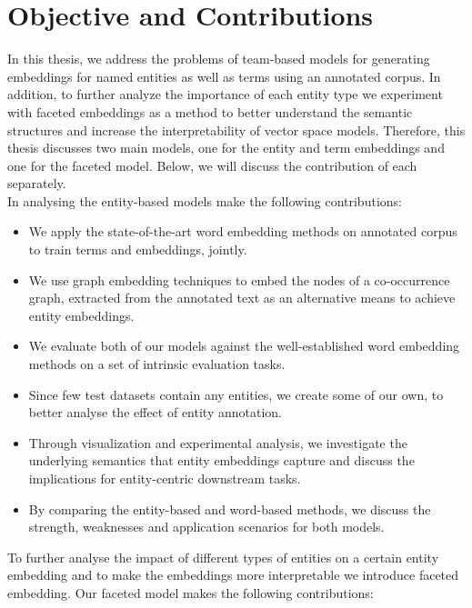 \section{Objective and Contributions}
In this thesis, we address the problems of team-based models for generating embeddings for named entities as well as terms using an annotated corpus. In addition, to further analyze the importance of each entity type we experiment with faceted embeddings as a method to better understand the semantic structures and increase the interpretability of vector space models. Therefore, this thesis discusses two main models, one for the entity and term embeddings and one for the faceted model. Below, we will discuss the contribution of each separately.\\
In analysing the entity-based models make the following contributions:
\begin{itemize}
\item We apply the state-of-the-art word embedding methods on annotated corpus to train terms and embeddings, jointly. 
\item We use graph embedding techniques to embed the nodes of a co-occurrence graph, extracted from the annotated text as an alternative means to achieve entity embeddings. 
\item We evaluate both of our models against the well-established word embedding methods on a set of intrinsic evaluation tasks. 
\item Since few test datasets contain any entities, we create some of our own, to better analyse the effect of entity annotation. 
\item Through visualization and experimental analysis, we investigate the underlying semantics that entity embeddings capture and discuss the implications for entity-centric downstream tasks.
\item By comparing the entity-based and word-based methods, we discuss the strength, weaknesses and application scenarios for both models.
\end{itemize}
To further analyse the impact of different types of entities on a certain entity embedding and to make the embeddings more interpretable we introduce faceted embedding. Our faceted model makes the following contributions: 
